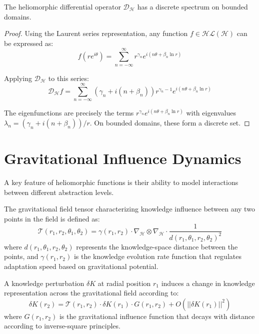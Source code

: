 \begin{theorem}
The heliomorphic differential operator $\mathcal{D}_{\mathcal{H}}$ has a discrete spectrum on bounded domains.
\end{theorem}

\begin{proof}
Using the Laurent series representation, any function $f \in \mathcal{HL}(\mathcal{H})$ can be expressed as:
\begin{equation}
f(re^{i\theta}) = \sum_{n=-\infty}^{\infty} r^{\gamma_n} e^{i(n\theta + \beta_n \ln r)}
\end{equation}

Applying $\mathcal{D}_{\mathcal{H}}$ to this series:
\begin{equation}
\mathcal{D}_{\mathcal{H}}f = \sum_{n=-\infty}^{\infty} (\gamma_n + i(n + \beta_n))r^{\gamma_n-1} e^{i(n\theta + \beta_n \ln r)}
\end{equation}

The eigenfunctions are precisely the terms $r^{\gamma_n} e^{i(n\theta + \beta_n \ln r)}$ with eigenvalues $\lambda_n = (\gamma_n + i(n + \beta_n))/r$. On bounded domains, these form a discrete set.
\end{proof}

\section{Gravitational Influence Dynamics}

A key feature of heliomorphic functions is their ability to model interactions between different abstraction levels.

\begin{definition}
The gravitational field tensor characterizing knowledge influence between any two points in the field is defined as:
\begin{equation}
\mathcal{T}(r_1, r_2, \theta_1, \theta_2) = \gamma(r_1, r_2) \cdot \nabla_{\mathcal{H}} \otimes \nabla_{\mathcal{H}} \cdot \frac{1}{d(r_1,\theta_1,r_2,\theta_2)^2}
\end{equation}
where $d(r_1,\theta_1,r_2,\theta_2)$ represents the knowledge-space distance between the points, and $\gamma(r_1, r_2)$ is the knowledge evolution rate function that regulates adaptation speed based on gravitational potential.
\end{definition}

\begin{theorem}
A knowledge perturbation $\delta K$ at radial position $r_1$ induces a change in knowledge representation across the gravitational field according to:
\begin{equation}
\delta K(r_2) = \mathcal{T}(r_1, r_2) \cdot \delta K(r_1) \cdot G(r_1, r_2) + O(||\delta K(r_1)||^2)
\end{equation}
where $G(r_1, r_2)$ is the gravitational influence function that decays with distance according to inverse-square principles.
\end{theorem}

